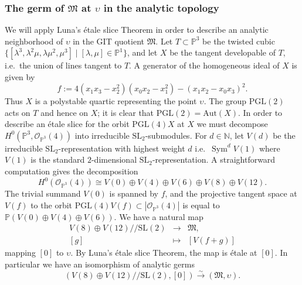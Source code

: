 \documentclass[11pt]{amsart}
\numberwithin{equation}{section}
\theoremstyle{plain}
\theoremstyle{remark}
\theoremstyle{definition}
\def\Sym{\operatorname{Sym}}
\newcommand{\Aut}{\mathrm{Aut}}
\newcommand{\PGL}{\mathrm{PGL}}
\newcommand{\SL}{\mathrm{SL}}
\newcommand{\gquot}{/\!\!/}
\newcommand{\cO}{{\mathscr O}}
\newcommand{\gM}{\mathfrak{M}}
\newcommand{\lra}{\longrightarrow}
\newcommand{\NN}{{\mathbb N}}
\newcommand{\PP}{{\mathbb P}}
\begin{document}
\subsubsection{The germ of $\gM$ at  $\upsilon$ in the analytic topology}
%
We will apply Luna's \'etale slice Theorem in order to describe an analytic neighborhood of $\upsilon$ in the GIT quotient $\gM$. 
Let $T\subset\PP^3$ be the twisted cubic $\{[\lambda^3,\lambda^2\mu,\lambda\mu^2,\mu^3] \mid [\lambda,\mu]\in\PP^1\}$, and let $X$ be the tangent developable of $T$, i.e.~the union of lines tangent to $T$. A generator of the homogeneous ideal of $X$ is given by
%
\begin{equation}\label{sviluppabile}
%
f:=4(x_1 x_3-x_2^2)(x_0 x_2-x_1^2)-(x_1 x_2-x_0 x_3)^2.
%
\end{equation}
%
Thus $X$ is a polystable quartic representing the point $\upsilon$. The group $\PGL(2)$ acts on $T$ and hence on $X$; it is clear that  $\PGL(2)=\Aut(X)$. 
In order to describe an \'etale slice for the orbit $\PGL(4) X$ at $X$ we must  decompose  $H^0(\PP^3,\cO_{\PP^3}(4))$ into irreducible $\SL_2$-submodules.  For $d\in\NN$, let $V(d)$ be the irreducible $\SL_2$-representation with highest weight $d$ i.e.~$\Sym^d V(1)$ where $V(1)$ is the standard $2$-dimensional $\SL_2$-representation. A straightforward  computation gives the decomposition
%
\begin{equation}\label{decompquar}
%
H^0( \cO_{\PP^3}(4))  \cong  V(0)\oplus V(4)\oplus V(6)\oplus V(8)\oplus V({12}).
%
\end{equation}
%
The trivial summand $V(0)$ is spanned by $f$, and  the projective tangent space at $V(f)$ to the orbit $\PGL(4) V(f)\subset |\cO_{\PP^3}(4)| $ is equal to  $\PP(V(0)\oplus V(4)\oplus V(6))$. 
We have a natural  map
%
\begin{equation}\label{fettaluna}
%
\begin{matrix}
%
V(8)\oplus V({12})\gquot\SL(2) & \lra & \gM, \\
%
[g] & \mapsto & [V(f+g)]
%
\end{matrix}
%
\end{equation}
%
mapping $[0]$ to $\upsilon$. By Luna's \'etale slice Theorem, the map is \'etale at $[0]$. In particular we have an isomorphism of analytic germs
%
%
\begin{equation}\label{upgerme}
%
(V(8)\oplus V({12})\gquot\SL(2),[0]) \overset{\sim}{\lra} (\gM,\upsilon).
%
\end{equation}
%
%
\end{document}

